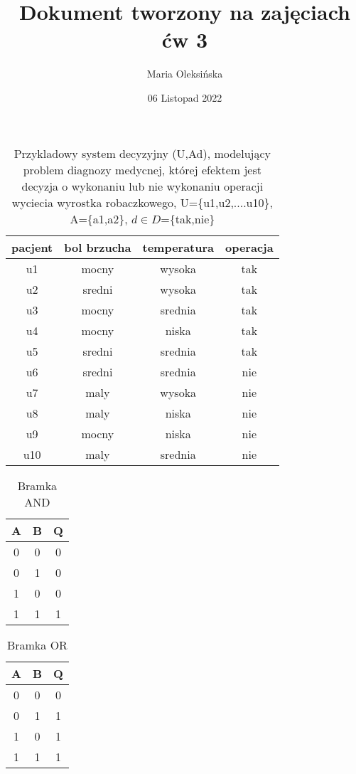 \documentclass[12pt, letterpaper, titlepage]{article}
\title{Dokument tworzony na  zajęciach ćw 3}
\author{Maria Oleksińska}
\date{06 Listopad 2022}
\begin{document}
\maketitle

\begin{table}[h]
\centering\caption{Przykladowy system decyzyjny (U,Ad), modelujący problem diagnozy medycnej, której efektem jest decyzja o wykonaniu lub nie wykonaniu operacji wyciecia wyrostka robaczkowego, U=\{u1,u2,....u10\}, A=\{a1,a2\}, $d \in D$=\{tak,nie\}}

\begin{tabular}{c| c c c}
 \hline
pacjent & bol brzucha &temperatura & operacja\\
 \hline


u1 & mocny & wysoka & tak\\
u2 & sredni & wysoka & tak\\
u3 & mocny & srednia & tak\\
u4 & mocny & niska & tak\\
u5 & sredni & srednia & tak\\
u6 & sredni & srednia & nie\\
u7 & maly & wysoka & nie\\
u8 & maly & niska & nie\\
u9 & mocny & niska & nie\\
u10 & maly & srednia & nie\\
 \hline


\end{tabular}
\end{table}



\begin{table}[h]
\centering\caption{Bramka AND}

\begin{tabular}{c c| c}

A & B & Q \\
 \hline
0 & 0 & 0\\
0 & 1 & 0\\
1 & 0 & 0\\
1 & 1 & 1\\
\end{tabular}
\end{table}


\begin{table}[h]
\centering\caption{Bramka OR}

\begin{tabular}{c c| c}

A & B & Q \\
 \hline
0 & 0 & 0\\
0 & 1 & 1\\
1 & 0 & 1\\
1 & 1 & 1\\
\end{tabular}
\end{table}
\end{document}
